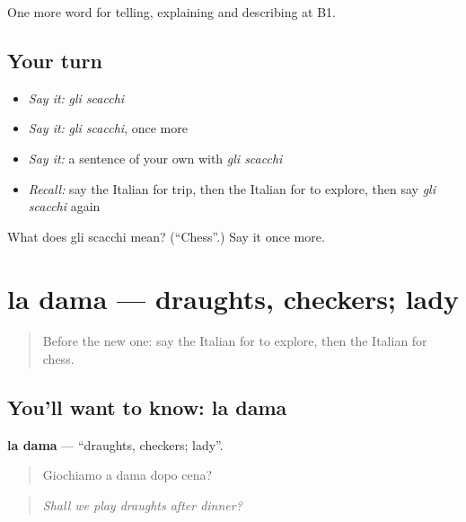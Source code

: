 \begin{grammarlens}[title={What you've built}]
One more word for telling, explaining and describing at B1.
\end{grammarlens}

\subsection*{Your turn}
\begin{itemize}
\raggedright
  \item \emph{Say it:} \emph{gli scacchi}
  \item \emph{Say it:} \emph{gli scacchi}, once more
  \item \emph{Say it:} a sentence of your own with \emph{gli scacchi}
  \item \emph{Recall:} say the Italian for trip, then the Italian for to explore, then say \emph{gli scacchi} again
\end{itemize}

\begin{tcolorbox}[breakable,colback=teal!4,colframe=teal!35!black,title={Before you move on}]
What does gli scacchi mean? (\textquotedblleft{}Chess\textquotedblright{}.) Say it once more.
\end{tcolorbox}
\section[la dama]{la dama — draughts, checkers; lady}

\label{lesson:IT-C503-dama}



\begin{quote}
Before the new one: say the Italian for to explore, then the Italian for chess.
\end{quote}

\subsection*{You'll want to know: la dama}
\textbf{la dama} — \textquotedblleft{}draughts, checkers; lady\textquotedblright{}.

\begin{quote}
Giochiamo a dama dopo cena?
\end{quote}

\begin{quote}
\emph{Shall we play draughts after dinner?}
\end{quote}

